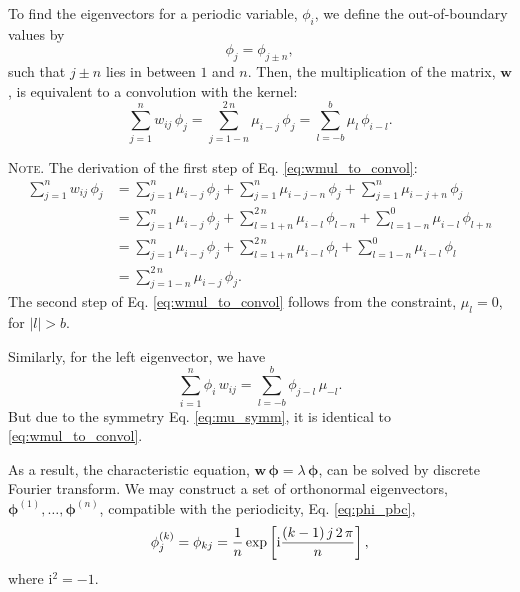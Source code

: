 \documentclass[reprint, superscriptaddress, floatfix]{revtex4-1}
\newcommand{\note}[1]{{\color{DarkGreen}\footnotesize \textsc{Note.} #1}}
\newcommand{\ii}{\mathrm{i}}
\begin{document}
To find the eigenvectors for a periodic variable, $\phi_i$,
we define the out-of-boundary values by
%
\begin{equation}
  \phi_j = \phi_{j \pm n},
\label{eq:phi_pbc}
\end{equation}
%
such that $j \pm n$ lies in between $1$ and $n$.
%
Then, the multiplication of the matrix, $\mathbf w$,
is equivalent to a convolution with the kernel:
%
\begin{equation}
  \sum_{ j = 1 }^n
    w_{ij} \, \phi_j
  =
  \sum_{ j = 1 - n }^{ 2 \, n }
    \mu_{i - j} \, \phi_j
  =
  \sum_{ l = -b }^{ b }
    \mu_l \, \phi_{ i - l}
  .
\label{eq:wmul_to_convol}
\end{equation}
%
\note{The derivation of the first step of
  Eq. \eqref{eq:wmul_to_convol}:
$$
\begin{aligned}
  \sum_{j = 1}^n
    w_{ij} \, \phi_j
  &=
  \sum_{j = 1}^n
    \mu_{i - j} \, \phi_j
  +
  \sum_{j = 1}^n
    \mu_{i - j - n} \, \phi_j
  +
  \sum_{j = 1}^n
    \mu_{i - j + n} \, \phi_j
  \\
  &=
  \sum_{j = 1}^n
    \mu_{i - j} \, \phi_j
  +
  \sum_{l = 1+n}^{2 \, n}
    \mu_{i - l} \, \phi_{l - n}
  +
  \sum_{l = 1-n}^0
    \mu_{i - l} \, \phi_{l + n}
  \\
  &=
  \sum_{j = 1}^n
    \mu_{i - j} \, \phi_j
  +
  \sum_{l = 1+n}^{2 \, n}
    \mu_{i - l} \, \phi_{l}
  +
  \sum_{l = 1-n}^0
    \mu_{i - l} \, \phi_{l}
  \\
  &=
  \sum_{j = 1-n}^{2 \, n}
    \mu_{i - j} \, \phi_j
  .
\end{aligned}
$$
The second step of Eq. \eqref{eq:wmul_to_convol}
follows from the constraint, $\mu_l = 0$, for $|l| > b$.

Similarly,
for the left eigenvector, we have
$$
  \sum_{ i = 1 }^n
    \phi_i \, w_{ij}
  =
  \sum_{ l = -b }^b
    \phi_{j - l} \, \mu_{-l}
  .
$$
But due to the symmetry Eq. \eqref{eq:mu_symm},
it is identical to \eqref{eq:wmul_to_convol}.
}
%
As a result, the characteristic equation,
$\mathbf w \, \pmb\phi = \lambda \, \pmb\phi$,
can be solved by discrete Fourier transform.
%
We may construct a set of orthonormal eigenvectors,
$\pmb\phi^{(1)}, \dots, \pmb\phi^{(n)}$,
compatible with the periodicity, Eq. \eqref{eq:phi_pbc},
%
\begin{equation}
  \phi^{(k)}_j
  =
  \phi_{kj}
  =
  \frac 1 n
  \exp
  \left[
    \ii
    \frac{ (k - 1) \, j \, 2 \, \pi }
         {            n             }
  \right]
  ,
  \notag
\end{equation}
%
where $\ii^2 = -1$.
%
\end{document}
